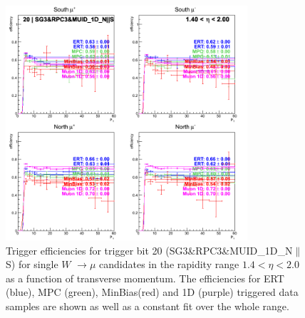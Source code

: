 \begin{figure}[ht]
\begin{center}
\includegraphics[width=0.8\textwidth]{./figures/run13_trigeffipt_eta1_trig20_lin.png}
\caption{\label{fig:run13_trigeffipt_eta1_nper0_trig20_lin} Trigger efficiencies for trigger bit 20 (SG3\&RPC3\&MUID\_1D\_N$\|$S) for single $W$ $\rightarrow \mu$ candidates in the rapidity range $ 1.4 < \eta < 2.0$ as a function of transverse momentum. The efficiencies for ERT (blue), MPC (green), MinBias(red) and 1D (purple) triggered data samples are shown as well as a constant fit over the whole range.}
\end{center}

\clearpage

\end{figure}
